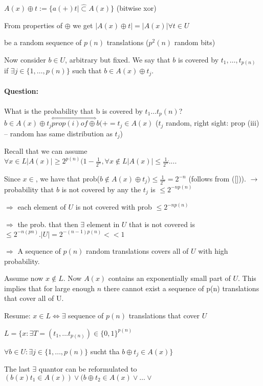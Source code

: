 \documentclass[11pt]{article}
\theoremstyle{definition}
\theoremstyle{definition}
\begin{document}
$ A(x) \oplus t := \{ a (+ ) t | \hat \subset A(x) \} $ (bitwise xor)

From properties of $ \oplus $ we get $ |A(x) \oplus t| = |A(x)| \forall t \in U $


be a random sequence of $ p(n) $ translations ($p^2(n) $ random bits)

Now consider $ b \in U $, arbitrary but fixed. We say that $ b $ is covered by $ t_1, \dots , t_{p(n)} $ if $ \exists j \in \{ 1, \dots, p(n) \} $ such that $ b \in A(x) \oplus t_j $.

\paragraph{Question:} What is the probability that b is covered by $ t_1 \dots t_p(n) $?
$ b \in A(x) \oplus t_j \overset{\Leftrightarrow}{prop (i) of \oplus} b (+= t_j \in A(x) $ ($t_j $ random, right sight: prop (iii) --  random has same distribution as $ t_j $)

Recall that we can assume $ \forall x \in L | A(x) | \geq 2^{p(n)} (1 - \frac{1}{2^n}, \forall x \not \in L |A(x)| \leq \frac{1}{2^n} \dot ....$%

Since $ x \in  $, we have that prob($b \not \in A(x) \oplus t_j ) \leq \frac{1}{2^n} = 2^{-n} $ (follows from ([])).
$ \rightarrow $ probability that $ b $ is not covered by any the $ t_j $ is $ \leq 2^{-np(n)} $

$ \Rightarrow $ each element of $ U $ is not covered with prob $ \leq 2^{-np(n)} $

$ \Rightarrow $ the prob. that then $ \exists $ element in $ U $ that is not covered is $ \leq 2^{-n(pn)}. |U| = 2^{-(n-1)p(n)} << 1 $

$ \Rightarrow $ A sequence of $ p(n) $ random translations covers all of $ U $ with high probability.

Assume now $ x \not \in L. $ Now $ A(x) $ contains an exponentially small part of $ U $. This implies that for large enough $ n $ there cannot exist a sequence of p(n) translations that cover all of U.

Resume: $ x \in L \Leftrightarrow \exists $ sequence of $ p(n) $ translations that cover $ U $

$ L = \{ x: \exists T = (t_1, \dots t_{p(n)} ) \in \{ 0, 1 \}^{p(n)} $

$ \forall b \in U: \exists j \in \{ 1, \dots, p(n)\} $ sucht tha $ b \oplus t_j \in A(x)\} $

The last $ \exists $ quantor can be reformulated to $ (b (x) t_1 \in A(x)) \vee (b \oplus t_2 \in A(x) \vee \dots \vee $ %
\end{document}

